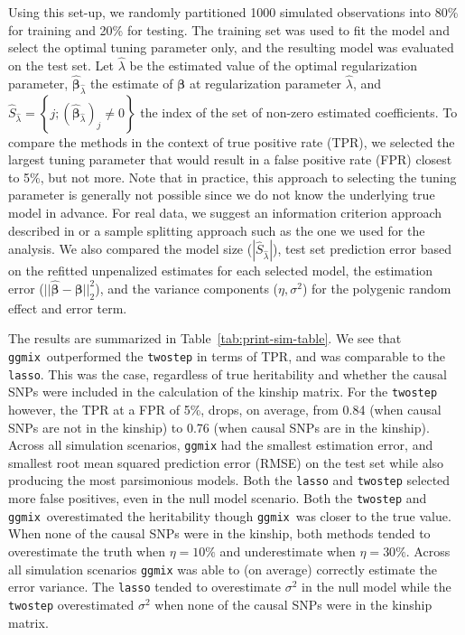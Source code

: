 \documentclass[10pt,letterpaper]{article}
\newcommand{\ggmix}{\texttt{ggmix}}
\newcommand{\bbeta}{\boldsymbol{\beta}}
\begin{document}
Using this set-up, we randomly partitioned 1000 simulated observations into 80\% for training and 20\% for testing. The training set was used to fit the model and select the optimal tuning parameter only, and the resulting model was evaluated on the test set. Let $\hat{\lambda}$ be the estimated value of the optimal regularization parameter, $\widehat{\bbeta}_{\hat{\lambda}}$ the estimate of $\bbeta$ at regularization parameter $\hat{\lambda}$, and $\widehat{S}_{\hat{\lambda}} = \left\lbrace j; (\widehat{\bbeta}_{\hat{\lambda}})_j \neq 0 \right\rbrace$ the index of the set of non-zero estimated coefficients. To compare the methods in the context of true positive rate (TPR), we selected the largest tuning parameter that would result in a false positive rate (FPR) closest to 5\%, but not more. Note that in practice, this approach to selecting the tuning parameter is generally not possible since we do not know the underlying true model in advance. For real data, we suggest an information criterion approach described in  or a sample splitting approach such as the one we used for the  analysis. We also compared the model size ($|\widehat{S}_{\hat{\lambda}}|$), test set prediction error based on the refitted unpenalized estimates for each selected model, the estimation error ($||\widehat{\bbeta} - \bbeta||_2^2$), and the variance components ($\eta, \sigma^2$) for the polygenic random effect and error term. 


The results are summarized in Table~\ref{tab:print-sim-table}. We see that \ggmix ~outperformed the \texttt{twostep} in terms of TPR, and was comparable to the \texttt{lasso}. This was the case, regardless of true heritability and whether the causal SNPs were included in the calculation of the kinship matrix. For the \texttt{twostep} however, the TPR at a FPR of 5\%, drops, on average, from 0.84 (when causal SNPs are not in the kinship) to 0.76 (when causal SNPs are in the kinship). Across all simulation scenarios, \texttt{ggmix} had the smallest estimation error, and smallest root mean squared prediction error (RMSE) on the test set while also producing the most parsimonious models. Both the \texttt{lasso} and \texttt{twostep} selected more false positives, even in the null model scenario. Both the \texttt{twostep} and \ggmix ~overestimated the heritability though \ggmix ~was closer to the true value. When none of the causal SNPs were in the kinship, both methods tended to overestimate the truth when $\eta=10\%$ and underestimate when $\eta=30\%$. Across all simulation scenarios \texttt{ggmix} was able to (on average) correctly estimate the error variance. The \texttt{lasso} tended to overestimate $\sigma^2$ in the null model while the \texttt{twostep} overestimated $\sigma^2$ when none of the causal SNPs were in the kinship matrix. 
\end{document}
